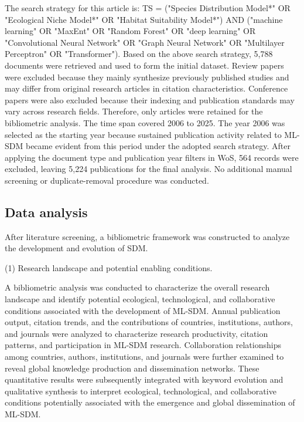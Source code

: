\documentclass[authoryear,preprint,review,12pt]{elsarticle}
\begin{document}
The search strategy for this article is: TS = ("Species Distribution Model*" OR "Ecological Niche Model*" OR "Habitat Suitability Model*") AND ("machine learning" OR "MaxEnt" OR "Random Forest" OR "deep learning" OR "Convolutional Neural Network" OR "Graph Neural Network" OR "Multilayer Perceptron" OR "Transformer"). Based on the above search strategy, 5,788 documents were retrieved and used to form the initial dataset. Review papers were excluded because they mainly synthesize previously published studies and may differ from original research articles in citation characteristics. Conference papers were also excluded because their indexing and publication standards may vary across research fields. Therefore, only articles were retained for the bibliometric analysis. The time span covered 2006 to 2025. The year 2006 was selected as the starting year because sustained publication activity related to ML-SDM became evident from this period under the adopted search strategy. After applying the document type and publication year filters in WoS, 564 records were excluded, leaving 5,224 publications for the final analysis. No additional manual screening or duplicate-removal procedure was conducted.


\subsection{Data analysis}

After literature screening, a bibliometric framework was constructed to analyze the development and evolution of SDM. 

(1) Research landscape and potential enabling conditions.

A bibliometric analysis was conducted to characterize the overall research landscape and identify potential ecological, technological, and collaborative conditions associated with the development of ML-SDM. Annual publication output, citation trends, and the contributions of countries, institutions, authors, and journals were analyzed to characterize research productivity, citation patterns, and participation in ML-SDM research. Collaboration relationships among countries, authors, institutions, and journals were further examined to reveal global knowledge production and dissemination networks. These quantitative results were subsequently integrated with keyword evolution and qualitative synthesis to interpret ecological, technological, and collaborative conditions potentially associated with the emergence and global dissemination of ML-SDM.
\end{document}

